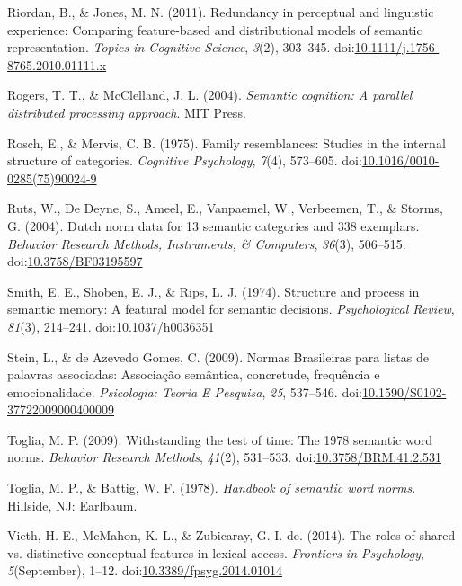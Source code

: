 \documentclass[english,man]{apa6}
\theoremstyle{definition}
\theoremstyle{definition}
\theoremstyle{definition}
\theoremstyle{remark}
\begin{document}
\hypertarget{ref-Riordan2011}{}
Riordan, B., \& Jones, M. N. (2011). Redundancy in perceptual and
linguistic experience: Comparing feature-based and distributional models
of semantic representation. \emph{Topics in Cognitive Science},
\emph{3}(2), 303--345.
doi:\href{https://doi.org/10.1111/j.1756-8765.2010.01111.x}{10.1111/j.1756-8765.2010.01111.x}

\hypertarget{ref-Rogers2004}{}
Rogers, T. T., \& McClelland, J. L. (2004). \emph{Semantic cognition: A
parallel distributed processing approach}. MIT Press.

\hypertarget{ref-Rosch1975}{}
Rosch, E., \& Mervis, C. B. (1975). Family resemblances: Studies in the
internal structure of categories. \emph{Cognitive Psychology},
\emph{7}(4), 573--605.
doi:\href{https://doi.org/10.1016/0010-0285(75)90024-9}{10.1016/0010-0285(75)90024-9}

\hypertarget{ref-Ruts2004}{}
Ruts, W., De Deyne, S., Ameel, E., Vanpaemel, W., Verbeemen, T., \&
Storms, G. (2004). Dutch norm data for 13 semantic categories and 338
exemplars. \emph{Behavior Research Methods, Instruments, \& Computers},
\emph{36}(3), 506--515.
doi:\href{https://doi.org/10.3758/BF03195597}{10.3758/BF03195597}

\hypertarget{ref-Smith1974}{}
Smith, E. E., Shoben, E. J., \& Rips, L. J. (1974). Structure and
process in semantic memory: A featural model for semantic decisions.
\emph{Psychological Review}, \emph{81}(3), 214--241.
doi:\href{https://doi.org/10.1037/h0036351}{10.1037/h0036351}

\hypertarget{ref-Stein2009}{}
Stein, L., \& de Azevedo Gomes, C. (2009). Normas Brasileiras para
listas de palavras associadas: Associação semântica, concretude,
frequência e emocionalidade. \emph{Psicologia: Teoria E Pesquisa},
\emph{25}, 537--546.
doi:\href{https://doi.org/10.1590/S0102-37722009000400009}{10.1590/S0102-37722009000400009}

\hypertarget{ref-Toglia2009}{}
Toglia, M. P. (2009). Withstanding the test of time: The 1978 semantic
word norms. \emph{Behavior Research Methods}, \emph{41}(2), 531--533.
doi:\href{https://doi.org/10.3758/BRM.41.2.531}{10.3758/BRM.41.2.531}

\hypertarget{ref-Toglia1978}{}
Toglia, M. P., \& Battig, W. F. (1978). \emph{Handbook of semantic word
norms}. Hillside, NJ: Earlbaum.

\hypertarget{ref-Vieth2014}{}
Vieth, H. E., McMahon, K. L., \& Zubicaray, G. I. de. (2014). The roles
of shared vs. distinctive conceptual features in lexical access.
\emph{Frontiers in Psychology}, \emph{5}(September), 1--12.
doi:\href{https://doi.org/10.3389/fpsyg.2014.01014}{10.3389/fpsyg.2014.01014}
\end{document}

